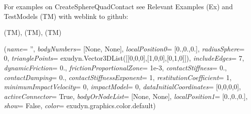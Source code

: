 %
\noindent For examples on CreateSphereQuadContact see Relevant Examples (Ex) and TestModels (TM) with weblink to github:
\bi
 \item \footnotesize {} (TM), 
 (TM), 
 (TM)
\ei

%
\begin{flushleft}
\label{sec:mainsystemextensions:CreateSphereTriangleContact}
({\it name}= '', {\it bodyNumbers}= [None, None], {\it localPosition0}= [0.,0.,0.], {\it radiusSphere}= 0, {\it trianglePoints}= exudyn.Vector3DList([[0,0,0],[1,0,0],[0,1,0]]), {\it includeEdges}= 7, {\it dynamicFriction}= 0., {\it frictionProportionalZone}= 1e-3, {\it contactStiffness}= 0., {\it contactDamping}= 0., {\it contactStiffnessExponent}= 1, {\it restitutionCoefficient}= 1, {\it minimumImpactVelocity}= 0, {\it impactModel}= 0, {\it dataInitialCoordinates}= [0,0,0,0], {\it activeConnector}= True, {\it bodyOrNodeList}= [None, None], {\it localPosition1}= [0.,0.,0.], {\it show}= False, {\it color}= exudyn.graphics.color.default)
\end{flushleft}
\setlength{\itemindent}{0.7cm}
